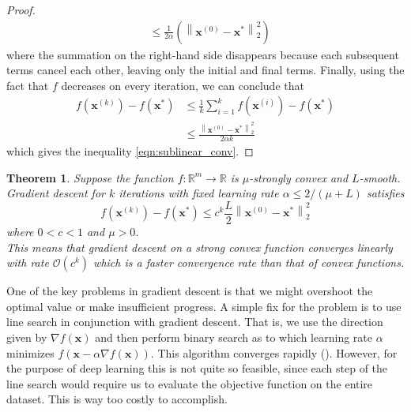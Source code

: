 \documentclass[12pt]{report}
\newtheorem{thm}{Theorem}[section]
\numberwithin{equation}{section}
\begin{document}
\begin{proof}
\begin{equation}
\begin{split}
& \leq \frac{1}{2 \alpha}\left(\left\|\bm{x}^{(0)}-\bm{x}^{*}\right\|_{2}^{2}\right)
\end{split}
\end{equation}
where the summation on the right-hand side disappears because each subsequent terms cancel each other, leaving only the initial and final terms. Finally, using the fact that $f$ decreases on every iteration, we can conclude that
\begin{equation}
\begin{split}
f\left(\bm{x}^{(k)}\right)-f\left(\bm{x}^{*}\right) & \leq \frac{1}{k} \sum_{i=1}^{k} f\left(\bm{x}^{(i)}\right)-f\left(\bm{x}^{*}\right) \\
& \leq \frac{\left\|\bm{x}^{(0)}-\bm{x}^{*}\right\|_{2}^{2}}{2 \alpha k}
\end{split}
\end{equation}
which gives the inequality \eqref{eqn:sublinear_conv}.
\end{proof}
\begin{thm}
Suppose the function $f: \mathbb{R}^{m} \rightarrow \mathbb{R}$ is $\mu$-strongly convex and $L$-smooth. Gradient descent for $k$ iterations with  fixed learning rate $\alpha \leq 2 / (\mu + L)$ satisfies
\begin{equation}\label{eqn:linear_conv}
f\left(\bm{x}^{(k)}\right)-f\left(\bm{x}^{*}\right) \leq c^k \frac{L}{2} \left\|\bm{x}^{(0)}-\bm{x}^{*}\right\|_{2}^{2}
\end{equation}
where $0<c<1$ and $\mu > 0$. \\ 
This means that gradient descent on a strong convex function converges linearly with rate $\mathcal{O}(c^k)$ which is a faster convergence rate than that of convex functions. %
\end{thm}
\noindent One of the key problems in gradient descent is that we might overshoot the optimal value or make insufficient progress. A simple fix for the problem is to use line search in conjunction with gradient descent. That is, we use the direction given by $\nabla f(\bm{x})$ and then perform binary search as to which learning rate $\alpha$ minimizes $f(\bm{x} - \alpha\nabla f(\bm{x}))$.
This algorithm converges rapidly ({\cite{boyd2004convex}}). However, for the purpose of deep learning this is not quite so feasible, since each step of the line search would require us to evaluate the objective function on the entire dataset. This is way too costly to accomplish.
\end{document}
